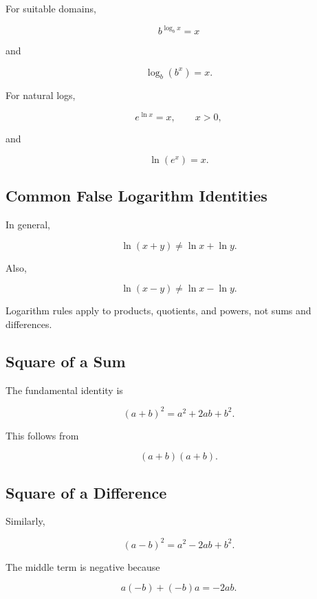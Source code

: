 For suitable domains,

\[
\boxed{
b^{\log_bx}=x
}
\]

and

\[
\boxed{
\log_b(b^x)=x.
}
\]

For natural logs,

\[
\boxed{
e^{\ln x}=x,
\qquad
x>0,
}
\]

and

\[
\boxed{
\ln(e^x)=x.
}
\]

\subsection{Common False Logarithm Identities}
\label{subsec:false-log-identities}

In general,

\[
\boxed{
\ln(x+y)
\neq
\ln x+\ln y.
}
\]

Also,

\[
\boxed{
\ln(x-y)
\neq
\ln x-\ln y.
}
\]

Logarithm rules apply to products, quotients, and powers, not sums and
differences.

\subsection{Square of a Sum}
\label{subsec:square-of-sum}

The fundamental identity is

\[
\boxed{
(a+b)^2
=
a^2+2ab+b^2.
}
\]

This follows from

\[
(a+b)(a+b).
\]

\subsection{Square of a Difference}
\label{subsec:square-of-difference}

Similarly,

\[
\boxed{
(a-b)^2
=
a^2-2ab+b^2.
}
\]

The middle term is negative because

\[
a(-b)+(-b)a=-2ab.
\]

